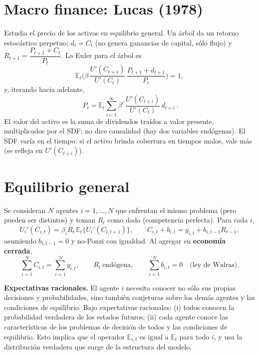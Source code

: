 \documentclass[11pt]{article}
\renewcommand{\boxed}[1]{#1}     %
\theoremstyle{definition}
\newcommand{\E}{\mathbb{E}}
\begin{document}
\section{Macro finance: Lucas (1978)}

Estudia el precio de los activos en equilibrio general. Un árbol da un retorno estocástico perpetuo;
$d_{t}=C_{t}$ (no genera ganancias de capital, sólo flujo) y $R_{t+1}=\dfrac{P_{t+1}+C_{t}}{P_{t}}$.
La Euler para el árbol es
\begin{equation}
\E_{t}\!\Big(\beta\,\frac{U'(C_{t+1})}{U'(C_{t})}\,\frac{P_{t+1}+d_{t+1}}{P_{t}}\Big)=1,
\end{equation}
y, iterando hacia adelante,
\begin{equation}
\boxed{\ P_{t}=\E_{t}\sum_{i=1}^{\infty}\beta^{i}\,\frac{U'(C_{t+i})}{U'(C_{t})}\,d_{t+i}\ }.
\end{equation}
El valor del activo es la suma de dividendos traídos a valor presente, multiplicados por el SDF; no
dice causalidad (hay dos variables endógenas). El SDF varía en el tiempo: si el activo brinda
cobertura en tiempos malos, vale más (se refleja en $U'(C_{t+i})$).

\section{Equilibrio general
}

Se consideran $N$ agentes $i=1,\dots,N$ que enfrentan el mismo problema (pero pueden ser distintos)
y toman $R_{t}$ como dado (competencia perfecta). Para cada $i$,
\begin{equation}
U_{i}'(C_{i,t})=\beta_{i}R_{t}\,\E_{t}\{U_{i}'(C_{i,t+1})\},
\qquad
C_{i,t}+b_{i,t}=y_{i,t}+b_{i,t-1}R_{t-1},
\end{equation}
asumiendo $b_{i,t-1}=0$ y no-Ponzi con igualdad. Al agregar en \textbf{economía cerrada},
\begin{equation}
\sum_{i=1}^{N}C_{i,t}=\sum_{i=1}^{N}y_{i,t},
\qquad R_{t}\ \text{endógena},
\qquad \sum_{i=1}^{N}b_{i,t}=0\quad\text{(ley de Walras).}
\end{equation}

\textbf{Expectativas racionales.} El agente $i$ necesita conocer no sólo sus propias decisiones y
probabilidades, sino también conjeturas sobre los demás agentes y las condiciones de equilibrio.
Bajo expectativas racionales: (i) todos conocen la probabilidad verdadera de los estados futuros;
(ii) cada agente conoce las características de los problemas de decisión de todos y las condiciones
de equilibrio. Esto implica que el operador $\E_{i,t}$ es igual a $\E_{t}$ para todo $i$, y usa la
distribución verdadera que surge de la estructura del modelo.
\end{document}
